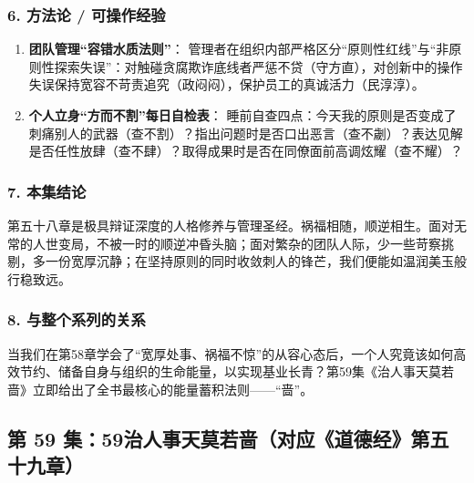 \subsubsection{6. 方法论 / 可操作经验}
\begin{enumerate}
    \item \textbf{团队管理“容错水质法则”}：
    管理者在组织内部严格区分“原则性红线”与“非原则性探索失误”：对触碰贪腐欺诈底线者严惩不贷（守方直），对创新中的操作失误保持宽容不苛责追究（政闷闷），保护员工的真诚活力（民淳淳）。
    \item \textbf{个人立身“方而不割”每日自检表}：
    睡前自查四点：今天我的原则是否变成了刺痛别人的武器（查不割）？指出问题时是否口出恶言（查不劌）？表达见解是否任性放肆（查不肆）？取得成果时是否在同僚面前高调炫耀（查不耀）？
\end{enumerate}

\subsubsection{7. 本集结论}
第五十八章是极具辩证深度的人格修养与管理圣经。祸福相随，顺逆相生。面对无常的人世变局，不被一时的顺逆冲昏头脑；面对繁杂的团队人际，少一些苛察挑剔，多一份宽厚沉静；在坚持原则的同时收敛刺人的锋芒，我们便能如温润美玉般行稳致远。

\subsubsection{8. 与整个系列的关系}
当我们在第58章学会了“宽厚处事、祸福不惊”的从容心态后，一个人究竟该如何高效节约、储备自身与组织的生命能量，以实现基业长青？第59集《治人事天莫若啬》立即给出了全书最核心的能量蓄积法则——“啬”。

\clearpage

\subsection{第 59 集：59治人事天莫若啬（对应《道德经》第五十九章）}
\label{sec:ep59}

